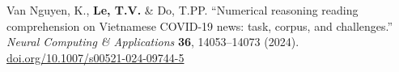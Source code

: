 Van Nguyen, K., \textbf{Le, T.V.} \& Do, T.PP. ``Numerical reasoning reading comprehension on Vietnamese COVID-19 news: task, corpus, and challenges.'' \textit{Neural Computing \& Applications} \textbf{36}, 14053--14073 (2024). \href{https://doi.org/10.1007/s00521-024-09744-5}{doi.org/10.1007/s00521-024-09744-5}
